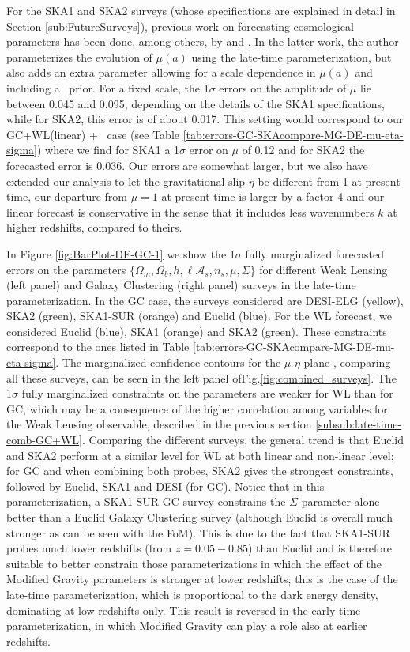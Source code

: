 For the SKA1 and SKA2 surveys (whose specifications are explained in detail in Section \ref{sub:FutureSurveys}), 
previous work on forecasting cosmological parameters has been done, among others, by \cite{baker_observational_2015} and \cite{bull_extending_2015}. 
In the latter work, the author parameterizes the evolution of $\mu(a)$ using the late-time parameterization, but also adds an extra parameter
allowing for a scale dependence in $\mu(a)$ and including a \planck\ prior. For a fixed scale,
the 1$\sigma$ errors on the amplitude of $\mu$ lie between 0.045 and 0.095, depending on the details of the SKA1 specifications, while  
for SKA2, this error is of about 0.017. This setting would correspond to our GC+WL(linear) + \planck\ case 
(see Table \ref{tab:errors-GC-SKAcompare-MG-DE-mu-eta-sigma}) where we find for SKA1 a 1$\sigma$ error on $\mu$ of 0.12 and for SKA2 the forecasted error is 0.036.
Our errors are somewhat larger, but we also have extended our analysis to let the gravitational slip $\eta$ be different from 1 at present time, our departure from $\mu=1$ at present time is larger by a factor 4 and 
our linear forecast is conservative in the sense that it includes less wavenumbers $k$ at higher redshifts, compared to theirs.


In Figure \ref{fig:BarPlot-DE-GC-1} we show the 1$\sigma$ fully
marginalized forecasted errors on the parameters 
$\{\Omega_{m},\Omega_{b},h,\ell \mathcal{A}_{s},n_{s},\mu,\Sigma\}$
for different Weak Lensing (left panel) and Galaxy Clustering (right panel)
surveys in the late-time parameterization. In the GC case, the surveys
considered are DESI-ELG (yellow), SKA2 (green), SKA1-SUR (orange)
and Euclid (blue). For the WL forecast, we considered Euclid (blue),
SKA1 (orange) and SKA2 (green). These constraints correspond to the ones
listed in Table \ref{tab:errors-GC-SKAcompare-MG-DE-mu-eta-sigma}. 
The marginalized confidence contours for the $\mu$-$\eta$ plane , 
comparing all these surveys, can be seen in the left panel ofFig.\ref{fig:combined_surveys}.
The 1$\sigma$ fully marginalized
constraints on the parameters are weaker for WL than for GC,
which may be a consequence of the higher correlation among variables
for the Weak Lensing observable, described in the previous section \ref{subsub:late-time-comb-GC+WL}.
Comparing the different surveys,
the general trend is that Euclid and SKA2 perform at a similar level for WL at both linear and non-linear level; for GC and when combining both probes, SKA2
gives the strongest constraints, followed by Euclid, SKA1 and DESI (for GC).
Notice that in this parameterization, a SKA1-SUR GC survey constrains
the $\Sigma$ parameter alone better than a Euclid Galaxy Clustering
survey (although Euclid is overall much stronger as can be seen with the FoM). This is due to the fact that SKA1-SUR probes much lower
redshifts (from $z=0.05-0.85$) than Euclid and is therefore suitable to better constrain those parameterizations in which the effect of the Modified Gravity parameters is stronger at lower redshifts; this is the case of the late-time parameterization, which is proportional
to the dark energy density, dominating at low redshifts only. This result is reversed in the early time parameterization, in which Modified Gravity can play a role also at earlier redshifts. 



